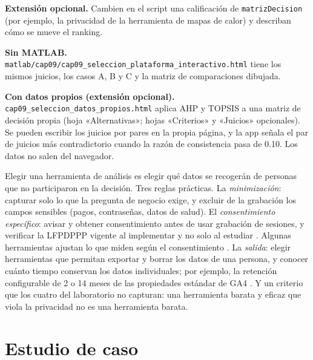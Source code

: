 \begin{cajaLaboratorio}
\textbf{Extensión opcional.} Cambien en el script una calificación de
\texttt{matrizDecision} (por ejemplo, la privacidad de la herramienta de
mapas de calor) y describan cómo se mueve el ranking.

\textbf{Sin MATLAB.}
\texttt{matlab/cap09/cap09\_seleccion\_plataforma\_interactivo.html} tiene los
mismos juicios, los casos A, B y C y la matriz de comparaciones dibujada.

\textbf{Con datos propios (extensión opcional).}
\texttt{cap09\_seleccion\_datos\_propios.html}
aplica AHP y TOPSIS a una matriz de decisión propia (hoja «Alternativas»; hojas «Criterios» y «Juicios» opcionales). Se pueden escribir los juicios por pares en la propia página, y la app señala el par de juicios más contradictorio cuando la razón de consistencia pasa de 0.10. Los datos no salen del navegador.
\end{cajaLaboratorio}

\begin{cajaEtica}
Elegir una herramienta de análisis es elegir qué datos se recogerán de
personas que no participaron en la decisión. Tres reglas prácticas. La
\emph{minimización}: capturar solo lo que la pregunta de negocio exige, y
excluir de la grabación los campos sensibles (pagos, contraseñas, datos de
salud). El \emph{consentimiento específico}: avisar y obtener consentimiento
antes de usar grabación de sesiones, y verificar la LFPDPPP vigente al
implementar y no solo al estudiar \parencite{dof_lfpdppp2025}. Algunas
herramientas ajustan lo que miden según el consentimiento
\parencite{google2026ga4consent}. La
\emph{salida}: elegir herramientas que permitan exportar y borrar los datos de
una persona, y conocer cuánto tiempo conservan los datos individuales; por ejemplo, la
retención configurable de 2 o 14 meses de las propiedades estándar de GA4
\parencite{google2026ga4retencion}. Y un criterio que los cuatro del laboratorio no capturan:
una herramienta barata y eficaz que viola la privacidad no es una herramienta
barata.
\end{cajaEtica}

\section{Estudio de caso}
\label{sec:cap09-caso}

